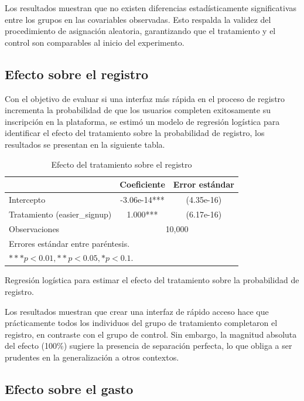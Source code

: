 \documentclass[conference]{IEEEtran}
\begin{document}
Los resultados muestran que no existen diferencias estadísticamente significativas entre los grupos en las covariables observadas. Esto respalda la validez del procedimiento de asignación aleatoria, garantizando que el tratamiento y el control son comparables al inicio del experimento.


\subsection{Efecto sobre el registro}

Con el objetivo de evaluar si una interfaz más rápida en el proceso de registro incrementa la probabilidad de que los usuarios completen exitosamente su inscripción en la plataforma,
se estimó un modelo de regresión logística para identificar el efecto del tratamiento sobre la probabilidad de registro, los resultados se presentan en la siguiente tabla.

\begin{table}[H]
\centering
\caption{Efecto del tratamiento sobre el registro}
\label{tab:glm_signup_treatment}
\begin{tabular}{lcc}
\toprule
 & \textbf{Coeficiente} & \textbf{Error estándar} \\ 
\midrule
Intercepto & -3.06e-14*** & (4.35e-16) \\
Tratamiento (easier\_signup) & 1.000*** & (6.17e-16) \\
\midrule
Observaciones & \multicolumn{2}{c}{10,000} \\
\bottomrule
\multicolumn{3}{l}{Errores estándar entre paréntesis.} \\
\multicolumn{3}{l}{$*** p < 0.01, ** p < 0.05, * p < 0.1$.} \\
\end{tabular}

\hfill \break

Regresión logística para estimar el efecto del tratamiento sobre la probabilidad de registro.
\end{table}

Los resultados muestran que crear una interfaz de rápido acceso hace que prácticamente todos los individuos del grupo de tratamiento completaron el registro, en contraste con el grupo de control. Sin embargo, la magnitud absoluta del efecto (100\%) sugiere la presencia de separación perfecta, lo que obliga a ser prudentes en la generalización a otros contextos.


\subsection{Efecto sobre el gasto}
\end{document}
